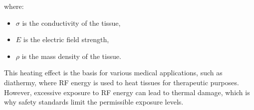 where:
\begin{itemize}
    \item \(\sigma\) is the conductivity of the tissue,
    \item \(E\) is the electric field strength,
    \item \(\rho\) is the mass density of the tissue.
\end{itemize}

This heating effect is the basis for various medical applications, such as diathermy, where RF energy is used to heat tissues for therapeutic purposes. However, excessive exposure to RF energy can lead to thermal damage, which is why safety standards limit the permissible exposure levels.

